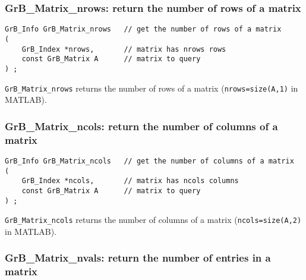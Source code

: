\documentclass[12pt]{article}
\begin{document}
\newpage
\subsubsection{{\sf GrB\_Matrix\_nrows:}        return the number of rows of a matrix}
\label{matrix_nrows}

\begin{mdframed}[userdefinedwidth=6in]
{\footnotesize
\begin{verbatim}
GrB_Info GrB_Matrix_nrows   // get the number of rows of a matrix
(
    GrB_Index *nrows,       // matrix has nrows rows
    const GrB_Matrix A      // matrix to query
) ;
\end{verbatim} } \end{mdframed}

\verb'GrB_Matrix_nrows' returns the number of rows of a matrix
(\verb'nrows=size(A,1)' in MATLAB).

\subsubsection{{\sf GrB\_Matrix\_ncols:}        return the number of columns of a matrix}
\label{matrix_ncols}

\begin{mdframed}[userdefinedwidth=6in]
{\footnotesize
\begin{verbatim}
GrB_Info GrB_Matrix_ncols   // get the number of columns of a matrix
(
    GrB_Index *ncols,       // matrix has ncols columns
    const GrB_Matrix A      // matrix to query
) ;
\end{verbatim}
} \end{mdframed}

\verb'GrB_Matrix_ncols' returns the number of columns of a matrix
(\verb'ncols=size(A,2)' in MATLAB).

\subsubsection{{\sf GrB\_Matrix\_nvals:}        return the number of entries in a matrix}
\label{matrix_nvals}
\end{document}
